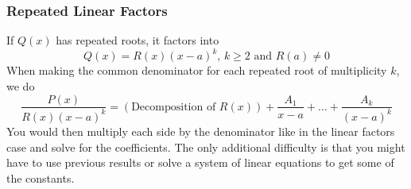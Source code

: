 \subsubsection{Repeated Linear Factors}
\noindent
If $Q(x)$ has repeated roots, it factors into
\begin{equation*}
	Q(x) = R(x)(x-a)^k\text{, }k \geq 2\text{ and }R(a) \neq 0
\end{equation*}
When making the common denominator for each repeated root of multiplicity $k$, we do
\begin{equation*}
	\frac{P(x)}{R(x)(x-a)^k} = \left(\text{Decomposition of }R(x)\right) + \frac{A_1}{x-a}+\ldots+\frac{A_k}{(x-a)^k}
\end{equation*}
You would then multiply each side by the denominator like in the linear factors case and solve for the coefficients. The only additional difficulty is that you might have to use previous results or solve a system of linear equations to get some of the constants.

